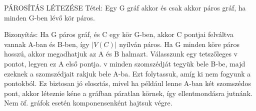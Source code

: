 \documentclass[]{article}
\begin{document}
\begin{framed}
PÁROSÍTÁS LÉTEZÉSE Tétel: Egy G gráf akkor és csak akkor páros gráf, ha minden G-ben lévő kör páros.
\end{framed}
\begin{leftbar}
Bizonyítás: Ha G páros gráf, és C egy kör G-ben, akkor C pontjai felváltva vannak A-ban és B-ben, így $|V(C)|$ nyílván páros. Ha G minden köre páros hosszú, akkor megadhatjuk az A és B halmazt. Válasszunk egy tetszőleges v pontot, legyen ez A első pontja.  v minden szomszédját tegyük bele B-be, majd ezeknek a szomszédjait rakjuk bele A-ba. Ezt folytassuk, amíg ki nem fogyunk a pontokból. Ez biztosan jó elosztás, mivel ha például lenne A-ban két szomszédos pont, akkor léteznie kéne a gráfban páratlan körnek, így ellentmondásra jutnánk. Nem öf. gráfok esetén komponensenként hajtsuk végre.
\end{leftbar}
\end{document}
